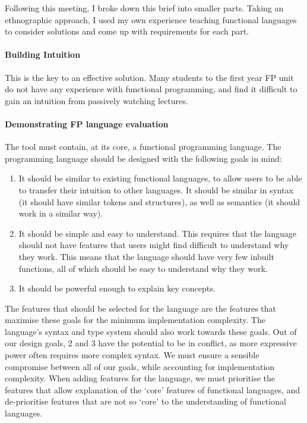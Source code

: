 Following this meeting, I broke down this brief into smaller parts. Taking an ethnographic approach, I used my own experience teaching functional languages to consider solutions and come up with requirements for each part. 

\paragraph{Building Intuition} This is the key to an effective solution. Many students to the first year FP unit do not have any experience with functional programming, and find it difficult to gain an intuition from passively watching lectures. 

\paragraph{Demonstrating FP language evaluation} The tool must contain, at its core, a functional programming language. The programming language should be designed with the following goals in mind:
\begin{enumerate}
    \item It should be similar to existing functional languages, to allow users to be able to transfer their intuition to other languages. It should be similar in syntax (it should have similar tokens and structures), as well as semantics (it should work in a similar way).
    \item It should be simple and easy to understand. This requires that the language should not have features that users might find difficult to understand why they work. This means that the language should have very few inbuilt functions, all of which should be easy to understand why they work. 
    \item It should be powerful enough to explain key concepts.
\end{enumerate}
The features that should be selected for the language are the features that maximise these goals for the minimum implementation complexity. The language's syntax and type system should also work towards these goals. Out of our design goals, 2 and 3 have the potential to be in conflict, as more expressive power often requires more complex syntax. We must ensure a sensible compromise between all of our goals, while accounting for implementation complexity. When adding features for the language, we must prioritise the features that allow explanation of the `core' features of functional languages, and de-prioritise features that are not so `core' to the understanding of functional languages. 

